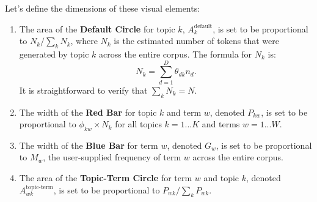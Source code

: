 \documentclass[12pt]{article}
\begin{document}
Let's define the dimensions of these visual elements:
\begin{enumerate}
\item The area of the \textbf{Default Circle} for topic $k$, $A^\text{default}_k$, is set to be proportional to $N_k/\sum_k N_k$, where $N_k$ is the estimated number of tokens that were generated by topic $k$ across the entire corpus. The formula for $N_k$ is:
$$
N_k = \sum_{d=1}^D \theta_{dk}n_d.
$$
It is straightforward to verify that $\sum_k N_k = N$.
\item The width of the \textbf{Red Bar} for topic $k$ and term $w$, denoted $P_{kw}$, is set to be proportional to $\phi_{kw} \times N_k$ for all topics $k = 1...K$ and terms $w = 1...W$.
\item The width of the \textbf{Blue Bar} for term $w$, denoted $G_w$, is set to be proportional to $M_w$, the user-supplied frequency of term $w$ across the entire corpus.
\item The area of the \textbf{Topic-Term Circle} for term $w$ and topic $k$, denoted $A^\text{topic-term}_{wk}$, is set to be proportional to $P_{wk}/\sum_k P_{wk}$.
\end{enumerate}
\end{document}
